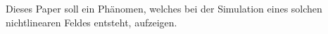 \begin{refsection}
Dieses Paper soll ein Phänomen, welches bei der Simulation eines solchen nichtlinearen Feldes entsteht, aufzeigen.



\printbibliography[heading=subbibliography]
\end{refsection}
